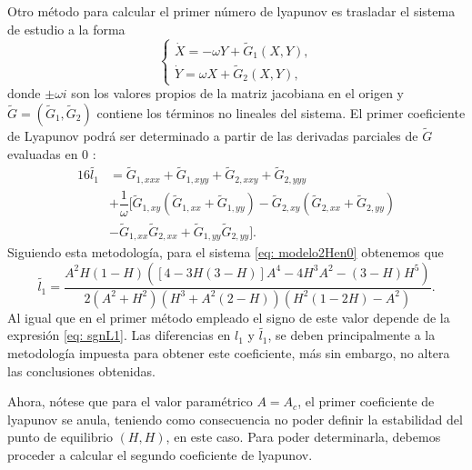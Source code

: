 \begin{remark}
	Otro método para calcular el primer número de lyapunov es trasladar el sistema de estudio a la forma
	\begin{equation*}
		\begin{cases}
			\dot{X} = -\omega Y + \tilde{G}_1(X, Y), \\
			\dot{Y} = \omega X + \tilde{G}_2(X, Y),
		\end{cases}
		\label{eq: normalFormWn}
	\end{equation*}
	donde $\pm \omega i$ son los valores propios de la matriz jacobiana en el origen y \linebreak $\tilde{G}=(\tilde{G}_1,\tilde{G}_2)$ contiene los términos no lineales del sistema. El primer coeficiente de Lyapunov podrá ser determinado a partir de las derivadas parciales de $\tilde{G}$ evaluadas en 0 \cite[p. 152]{guckenheimer1983}: 
	\begin{equation*}
		\begin{aligned}
			16\tilde{l_1} &= \tilde{G}_{1,xxx} + \tilde{G}_{1,xyy} + \tilde{G}_{2,xxy} + \tilde{G}_{2,yyy} \\
			&+ \dfrac{1}{\omega} [ \tilde{G}_{1,xy}(\tilde{G}_{1,xx} + \tilde{G}_{1,yy}) - \tilde{G}_{2,xy}(\tilde{G}_{2,xx} + \tilde{G}_{2,yy}) \\
			&- \tilde{G}_{1,xx}\tilde{G}_{2,xx} + \tilde{G}_{1,yy}\tilde{G}_{2,yy} ].
		\end{aligned}
	\end{equation*}
	Siguiendo esta metodología, para el sistema \eqref{eq: modelo2Hen0} obtenemos que
	\begin{equation*}
		\tilde{l_1} = \dfrac{A^2 H(1 - H)([4 - 3H(3 - H)]A^4 -4H^3A^2 - (3 - H)H^5)}{2(A^2 + H^2)(H^3 + A^2(2 - H))(H^2(1 - 2H)- A^2)}.
		\label{eq: l1Perko}
	\end{equation*}
	Al igual que en el primer método empleado el signo de este valor depende de la expresión \eqref{eq: sgnL1}. Las diferencias en $l_1$ y $\tilde{l_1}$, se deben principalmente a la metodología impuesta para obtener este coeficiente, más sin embargo, no altera las conclusiones obtenidas. 
\end{remark}

Ahora, nótese que para el valor paramétrico $A=A_c$, el primer coeficiente de lyapunov se anula, teniendo como consecuencia no poder definir la estabilidad del punto de equilibrio $(H, H)$, en este caso. Para poder determinarla, debemos proceder a calcular el segundo coeficiente de lyapunov.

